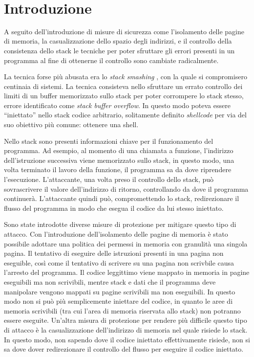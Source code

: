 \thispagestyle{empty}
\
\newpage
\clearpage{\pagestyle{empty}\cleardoublepage}
\mainmatter
\chapter{Introduzione}


A seguito dell'introduzione di misure di sicurezza come l'isolamento
delle pagine di memoria, la casualizzazione dello spazio degli
indirizzi, e il controllo della consistenza dello stack le tecniche
per poter sfruttare gli errori presenti in un programma al fine di
ottenerne il controllo sono cambiate radicalmente.

La tecnica forse più abusata era lo \emph{stack smashing}
\cite{Phrack-96}, con la quale si compromisero centinaia di
sistemi. La tecnica consisteva nello sfruttare un errato controllo dei
limiti di un buffer memorizzato sullo stack per poter corrompere lo
stack stesso, errore identificato come \emph{stack buffer
  overflow}. In questo modo poteva essere ``iniettato'' nello stack
codice arbitrario, solitamente definito \emph{shellcode} per via del
suo obiettivo più comune: ottenere una shell. 

Nello stack sono presenti informazioni chiave per il funzionamento del
programma. Ad esempio, al momento di una chiamata a funzione,
l'indirizzo dell'istruzione successiva viene memorizzato sullo stack,
in questo modo, una volta terminato il lavoro della funzione, il
programma sa da dove riprendere l'esecuzione. L'attaccante, una volta
preso il controllo dello stack, può sovrascrivere il valore
dell'indirizzo di ritorno, controllando da dove il programma
continuerà. L'attaccante quindi può, compromettendo lo stack,
redirezionare il flusso del programma in modo che esegua il codice da
lui stesso iniettato.

Sono state introdotte diverse misure di protezione per mitigare questo
tipo di attacco. Con l'introduzione dell'isolamento delle pagine di
memoria è stato possibile adottare una politica dei permessi in
memoria con granulità una singola pagina. Il tentativo di eseguire
delle istruzioni presenti in una pagina non eseguible, così come il
tentativo di scrivere su una pagina non scrivbile causa l'arresto del
programma. Il codice leggittimo viene mappato in memoria in pagine
eseguibili ma non scrivibili, mentre stack e dati che il programma
deve manipolare vengono mappati su pagine scrivibili ma non
eseguibili. In questo modo non si può più semplicemente iniettare del
codice, in quanto le aree di memoria scrivibili (tra cui l'area di
memoria riservata allo stack) non potranno essere eseguite. Un'altra
misura di protezione per rendere più difficile questo tipo di attacco
è la casualizzazione dell'indirizzo di memoria nel quale risiede lo
stack. In questo modo, non sapendo dove il codice iniettato
effettivamente risiede, non si sa dove dover redirezionare il
controllo del flusso per eseguire il codice iniettato.

